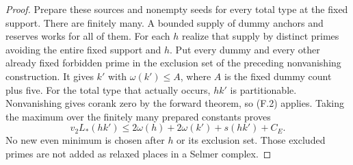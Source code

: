 \begin{proof}
Prepare these sources and nonempty seeds for every total type at
the fixed support. There are finitely many. A bounded supply of
dummy anchors and reserves works for all of them. For each $h$
realize that supply by distinct primes avoiding the entire fixed
support and $h$. Put every dummy and every other already fixed
forbidden prime in the exclusion set of the preceding
nonvanishing construction. It gives $k'$ with
$\omega(k')\le A$, where $A$ is the fixed dummy count plus five.
For the total type that actually occurs, $hk'$ is partitionable.
Nonvanishing gives corank zero by the forward theorem, so (F.2)
applies. Taking the maximum over the finitely many prepared
constants proves
\[
 v_2L_*(hk')\le2\omega(h)+2\omega(k')+s(hk')+C_E.                 \tag{F.3}
\]
No new even minimum is chosen after $h$ or its exclusion set.
Those excluded primes are not added as relaxed places in a
Selmer complex.
\end{proof}


